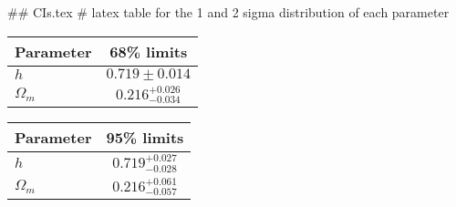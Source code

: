 ## CIs.tex
# latex table for the 1 and 2 sigma distribution of each parameter

\begin{tabular} { l  c}
 Parameter &  68\% limits\\
\hline
{\boldmath$h              $} & $0.719\pm 0.014            $\\
{\boldmath$\Omega_m       $} & $0.216^{+0.026}_{-0.034}   $\\
\hline
\end{tabular}

\begin{tabular} { l  c}
 Parameter &  95\% limits\\
\hline
{\boldmath$h              $} & $0.719^{+0.027}_{-0.028}   $\\
{\boldmath$\Omega_m       $} & $0.216^{+0.061}_{-0.057}   $\\
\hline
\end{tabular}

